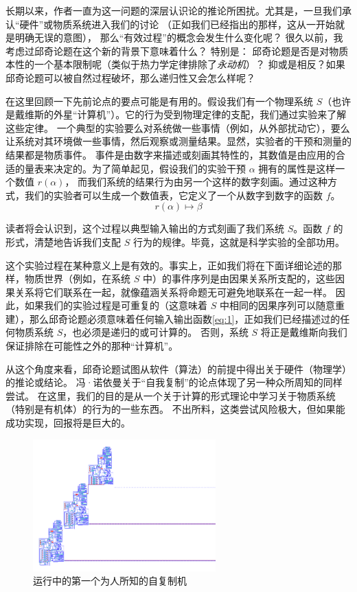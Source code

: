\documentclass[a4paper,12pt]{article}
\begin{document}
长期以来，作者一直为这一问题的深层认识论的推论所困扰\cite{RosenR1962}。尤其是，一旦我们承认“硬件”或物质系统进入我们的讨论
（正如我们已经指出的那样，这从一开始就是明确无误的意图）， 那么“有效过程”的概念会发生什么变化呢？
很久以前\cite{RosenR1962}，我考虑过邱奇论题在这个新的背景下意味着什么？ 特别是：
邱奇论题是否是对物质本性的一个基本限制呢（类似于热力学定律排除了\emph{永动机}）？
抑或是相反？如果邱奇论题可以被自然过程破坏，那么递归性又会怎么样呢？

在这里回顾一下先前论点的要点可能是有用的。假设我们有一个物理系统 $S$（也许是戴维斯的外星“计算机”）。它的行为受到物理定律的支配，我们通过实验来了解这些定律。
一个典型的实验要么对系统做一些事情（例如，从外部扰动它），要么让系统对其环境做一些事情，然后观察或测量结果。显然，实验者的干预和测量的结果都是物质事件。
事件是由数字来描述或刻画其特性的，其数值是由应用的合适的量表来决定的\cite{RosenR1978}。为了简单起见，假设我们的实验干预 $\alpha$ 拥有的属性是这样一个数值 $r(\alpha)$，
而我们系统的结果行为由另一个这样的数字刻画。通过这种方式，我们的实验者可以生成一个数值表，它定义了一个从数字到数字的函数 $f$。 \begin{equation}\label{eq:1} r(\alpha) \mapsto \beta\end{equation}

读者将会认识到，这个过程以典型输入输出的方式刻画了我们系统 $S$。函数 $f$ 的形式，清楚地告诉我们支配 $S$ 行为的规律。毕竟，这就是科学实验的全部功用。

这个实验过程在某种意义上是有效的。事实上，正如我们将在下面详细论述的那样，物质世界（例如，在系统 $S$ 中）的事件序列是由因果关系所支配的，这些因果关系将它们联系在一起，就像蕴涵关系将命题无可避免地联系在一起一样。
因此，如果我们的实验过程是可重复的（这意味着 $S$ 中相同的因果序列可以随意重建），那么邱奇论题必须意味着任何输入输出函数\ref{eq:1}，正如我们已经描述过的任何物质系统 $S$，也必须是递归的或可计算的。
否则，系统 $S$ 将正是戴维斯向我们保证排除在可能性之外的那种“计算机”。

从这个角度来看，邱奇论题试图从软件（算法）的前提中得出关于硬件（物理学）的推论或结论。
冯·诺依曼关于“自我复制”的论点\cite{BurksA1966}体现了另一种众所周知的同样尝试。
在这里，我们的目的是从一个关于计算的形式理论中学习关于物质系统（特别是有机体）的行为的一些东西。
不出所料，这类尝试风险极大，但如果能成功实现，回报将是巨大的。

\begin{figure}[ht]
\centering
\includegraphics[height=2.0in]{images/self_reprod.png}
\caption{运行中的第一个为人所知的自复制机}
\end{figure}
\end{document}
